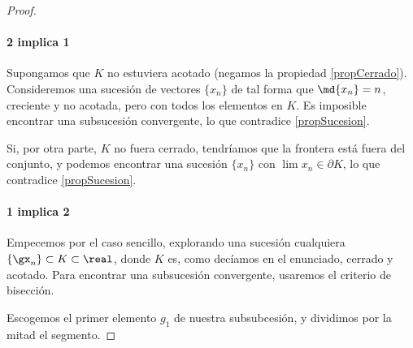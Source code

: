 \documentclass{apuntes}
\begin{document}
\begin{proof}

\paragraph{2 implica 1}  Supongamos que $K$ no estuviera acotado (negamos la propiedad \ref{propCerrado}). Consideremos una sucesión de vectores $\{x_n\}$ de tal forma que $\md{x_n} = n$, creciente y no acotada, pero con todos los elementos en $K$. Es imposible encontrar una subsucesión convergente, lo que contradice \ref{propSucesion}.

Si, por otra parte, $K$ no fuera cerrado, tendríamos que la frontera está fuera del conjunto, y podemos encontrar una sucesión $\{x_n\}$ con $\lim x_n \in ∂K$, lo que contradice \ref{propSucesion}.

\paragraph{1 implica 2} Empecemos por el caso sencillo, explorando una sucesión cualquiera $\{\gx_n\} \subset K \subset \real$, donde $K$ es, como decíamos en el enunciado, cerrado y acotado. Para encontrar una subsucesión convergente, usaremos el criterio de bisección.

\begin{center}
\end{center}

Escogemos el primer elemento $g_1$ de nuestra subsubcesión, y dividimos por la mitad el segmento.


\end{proof}
\end{document}
